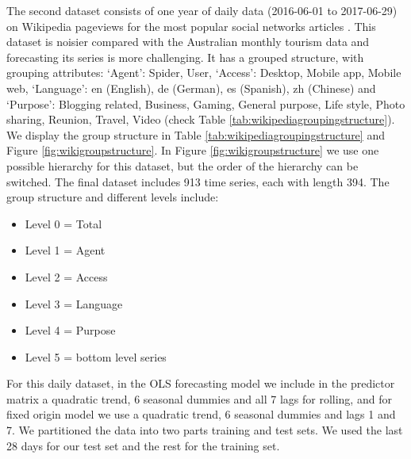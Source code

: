 \documentclass[11pt,a4paper,]{article}
\providecommand{\tightlist}{%
  \setlength{\itemsep}{0pt}\setlength{\parskip}{0pt}}
\begin{document}
The second dataset consists of one year of daily data (2016-06-01 to
2017-06-29) on Wikipedia pageviews for the most popular social networks
articles \autocite{ashouri2018}. This dataset is noisier compared with
the Australian monthly tourism data and forecasting its series is more
challenging. It has a grouped structure, with grouping attributes:
`Agent': Spider, User, `Access': Desktop, Mobile app, Mobile web,
`Language': en (English), de (German), es (Spanish), zh (Chinese) and
`Purpose': Blogging related, Business, Gaming, General purpose, Life
style, Photo sharing, Reunion, Travel, Video (check Table
\ref{tab:wikipediagroupingstructure}). We display the group structure in
Table \ref{tab:wikipediagroupingstructure} and Figure
\ref{fig:wikigroupstructure}. In Figure \ref{fig:wikigroupstructure} we
use one possible hierarchy for this dataset, but the order of the
hierarchy can be switched. The final dataset includes 913 time series,
each with length 394. The group structure and different levels include:

\begin{itemize}
\tightlist
\item
  Level 0 = Total
\item
  Level 1 = Agent
\item
  Level 2 = Access
\item
  Level 3 = Language
\item
  Level 4 = Purpose
\item
  Level 5 = bottom level series
\end{itemize}

For this daily dataset, in the OLS forecasting model we include in the
predictor matrix a quadratic trend, 6 seasonal dummies and all 7 lags
for rolling, and for fixed origin model we use a quadratic trend, 6
seasonal dummies and lags 1 and 7. We partitioned the data into two
parts training and test sets. We used the last 28 days for our test set
and the rest for the training set.
\end{document}
